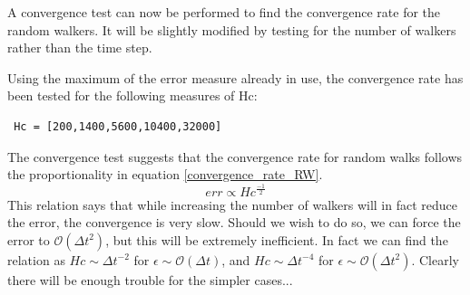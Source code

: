 
A convergence test can now be performed to find the convergence rate for the random walkers.
It will be slightly modified by testing for the number of walkers rather than the time step. 


Using the maximum of the error measure already in use, the convergence rate has been tested for the following measures of Hc:
\begin{lstlisting}
 Hc = [200,1400,5600,10400,32000]
\end{lstlisting}

The convergence test suggests that the convergence rate for random walks follows the proportionality in equation \eqref{convergence_rate_RW}. 
\begin{equation}\label{convergence_rate_RW}
err \propto Hc^{\frac{-1}{2}}
\end{equation}
This relation says that while increasing the number of walkers will in fact reduce the error, the convergence is very slow. 
Should we wish to do so, we can force the error to $\mathcal{O}(\Delta t^2)$, but this will be extremely inefficient. In fact we can find the relation as $Hc\sim\Delta t^{-2}$ for $\epsilon\sim\mathcal{O}(\Delta t)$, and $Hc\sim\Delta t^{-4}$ for $\epsilon\sim\mathcal{O}(\Delta t^2)$. 
Clearly there will be enough trouble for the simpler cases...



